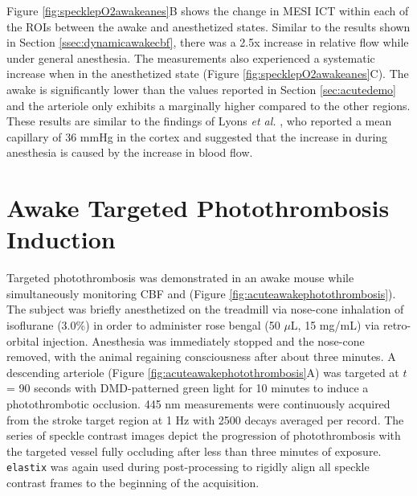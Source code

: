 Figure \ref{fig:specklepO2awakeanes}B shows the change in MESI ICT within each of the ROIs between the awake and anesthetized states. Similar to the results shown in Section \ref{ssec:dynamicawakecbf}, there was a 2.5x increase in relative flow while under general anesthesia. The  measurements also experienced a systematic increase when in the anesthetized state (Figure \ref{fig:specklepO2awakeanes}C). The awake  is significantly lower than the values reported in Section \ref{sec:acutedemo} and the arteriole only exhibits a marginally higher  compared to the other regions. These results are similar to the findings of Lyons \textit{et al.} \cite{Lyons:2016bd}, who reported a mean capillary  of 36 mmHg in the cortex and suggested that the increase in  during anesthesia is caused by the increase in blood flow.



\section{Awake Targeted Photothrombosis Induction}

Targeted photothrombosis was demonstrated in an awake mouse while simultaneously monitoring CBF and  (Figure \ref{fig:acuteawakephotothrombosis}). The subject was briefly anesthetized on the treadmill via nose-cone inhalation of isoflurane (3.0\%) in order to administer rose bengal (50 $\mu$L, 15 mg/mL) via retro-orbital injection. Anesthesia was immediately stopped and the nose-cone removed, with the animal regaining consciousness after about three minutes. A descending arteriole (Figure \ref{fig:acuteawakephotothrombosis}A) was targeted at $t$ = 90 seconds with DMD-patterned green light for 10 minutes to induce a photothrombotic occlusion. 445 nm  measurements were continuously acquired from the stroke target region at 1 Hz with 2500 decays averaged per record. The series of speckle contrast images depict the progression of photothrombosis with the targeted vessel fully occluding after less than three minutes of exposure. \texttt{elastix} was again used during post-processing to rigidly align all speckle contrast frames to the beginning of the acquisition.

